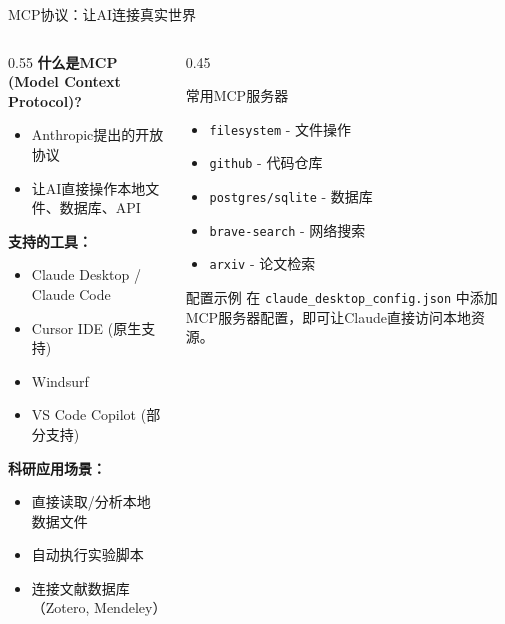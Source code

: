 \documentclass[aspectratio=169,11pt]{beamer}
\begin{document}
\begin{frame}{MCP协议：让AI连接真实世界}
    \begin{columns}
        \begin{column}{0.55\textwidth}
            \textbf{什么是MCP (Model Context Protocol)?}
            \begin{itemize}
                \item Anthropic提出的开放协议
                \item 让AI直接操作本地文件、数据库、API
            \end{itemize}
            
            \vspace{0.3cm}
            \textbf{支持的工具：}
            \begin{itemize}
                \item Claude Desktop / Claude Code
                \item Cursor IDE (原生支持)
                \item Windsurf
                \item VS Code Copilot (部分支持)
            \end{itemize}
            
            \vspace{0.3cm}
            \textbf{科研应用场景：}
            \begin{itemize}
                \item 直接读取/分析本地数据文件
                \item 自动执行实验脚本
                \item 连接文献数据库（Zotero, Mendeley）
            \end{itemize}
        \end{column}
        \begin{column}{0.45\textwidth}
            \begin{block}{常用MCP服务器}
                \begin{itemize}
                    \item \texttt{filesystem} - 文件操作
                    \item \texttt{github} - 代码仓库
                    \item \texttt{postgres/sqlite} - 数据库
                    \item \texttt{brave-search} - 网络搜索
                    \item \texttt{arxiv} - 论文检索
                \end{itemize}
            \end{block}
            
            \vspace{0.3cm}
            \begin{alertblock}{配置示例}
                \small
                在 \texttt{claude\_desktop\_config.json} 中添加MCP服务器配置，即可让Claude直接访问本地资源。
            \end{alertblock}
        \end{column}
    \end{columns}
\end{frame}
\end{document}
